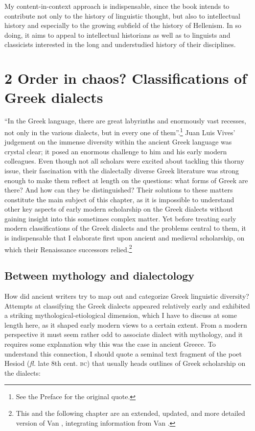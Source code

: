 \documentclass[output=paper]{langsci/langscibook}
\begin{document}
My content-in-context approach is indispensable, since the book intends to contribute not only to the history of linguistic thought, but also to intellectual history and especially to the growing subfield of the history of Hellenism. In so doing, it aims to appeal to intellectual historians as well as to linguists and classicists interested in the long and understudied history of their disciplines.

\section{2  Order in chaos? Classifications of Greek dialects}
\hypertarget{Toc19704806}{}
“In the Greek language, there are great labyrinths and enormously vast recesses, not only in the various dialects, but in every one of them”.\footnote{See the Preface for the original quote.} Juan Luis Vives’ judgement on the immense diversity within the ancient Greek language was crystal clear; it posed an enormous challenge to him and his early modern colleagues. Even though not all scholars were excited about tackling this thorny issue, their fascination with the dialectally diverse Greek literature was strong enough to make them reflect at length on the questions: what forms of Greek are there? And how can they be distinguished? Their solutions to these matters constitute the main subject of this chapter, as it is impossible to understand other key aspects of early modern scholarship on the Greek dialects without gaining insight into this sometimes complex matter. Yet before treating early modern classifications of the Greek dialects and the problems central to them, it is indispensable that I elaborate first upon ancient and medieval scholarship, on which their Renaissance successors relied.\footnote{This and the following chapter are an extended, updated, and more detailed version of Van \citet{Rooy2016a}, integrating information from Van \citet{Rooy2018b}.}

\subsection{Between mythology and dialectology}
\hypertarget{Toc19704807}{}
How did ancient writers try to map out and categorize Greek linguistic diversity? Attempts at classifying the Greek dialects appeared relatively early and exhibited a striking mythological-etiological dimension, which I have to discuss at some length here, as it shaped early modern views to a certain extent. From a modern perspective it must seem rather odd to associate dialect with mythology, and it requires some explanation why this was the case in ancient Greece. To understand this connection, I should quote a seminal text fragment of the poet Hesiod (\textit{fl.} late 8th cent. \textsc{bc}) that usually heads outlines of Greek scholarship on the dialects:
\end{document}
